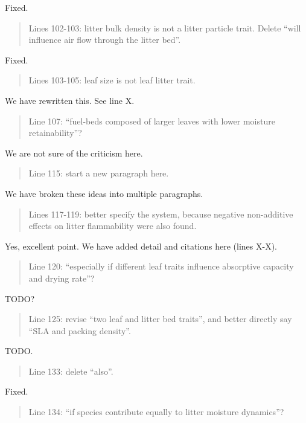\documentclass[letterpaper, 12pt]{letter}
\begin{document}
\begin{letter}{}
Fixed.

\begin{quote}
Lines 102-103: litter bulk density is not a litter particle trait. Delete “will influence air flow through the litter bed”.
\end{quote}

Fixed.

\begin{quote}
Lines 103-105: leaf size is not leaf litter trait.
\end{quote}

We have rewritten this. See line X.

\begin{quote}
Line 107: “fuel-beds composed of larger leaves with lower moisture retainability”?
\end{quote}

We are not sure of the criticism here.

\begin{quote}
Line 115: start a new paragraph here.
\end{quote}

We have broken these ideas into multiple paragraphs.

\begin{quote}
Lines 117-119: better specify the system, because negative non-additive effects on litter
flammability were also found.
\end{quote}

Yes, excellent point. We have added detail and citations here (lines X-X).

\begin{quote}
Line 120: “especially if different leaf traits influence absorptive capacity and drying rate”?
\end{quote}

TODO?

\begin{quote}
Line 125: revise “two leaf and litter bed traits”, and better directly say “SLA and packing density”.
\end{quote}


TODO.

\begin{quote}
Line 133: delete “also”.
\end{quote}

Fixed.

\begin{quote}
Line 134: “if species contribute equally to litter moisture dynamics”?
\end{quote}


\end{letter}
\end{document}
